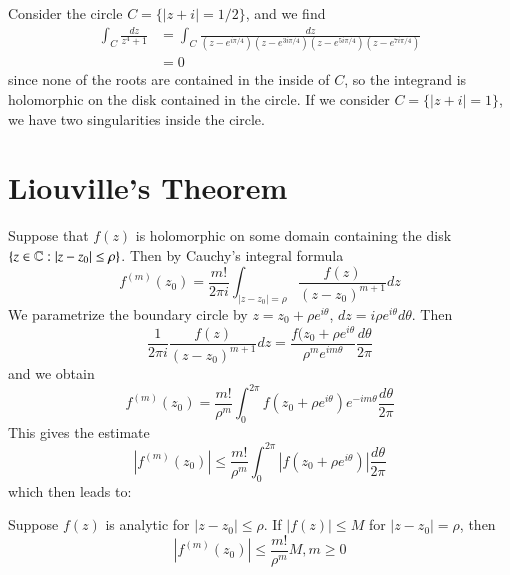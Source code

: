 \begin{example}
    Consider the circle $C= \{|z+i| = 1/2\}$, and we find \begin{align*}
        \int_C\frac{dz}{z^4+1} &= \int_C\frac{dz}{(z-e^{i\pi/4})(z-e^{3i\pi/4})(z-e^{5i\pi/4})(z-e^{7i\pi/4})} \\
        &= 0
    \end{align*}
    since none of the roots are contained in the inside of $C$, so the integrand is holomorphic on the disk contained in the circle. If we consider $C= \{|z+i| = 1\}$, we have two singularities inside the circle. 
\end{example}



\section{Liouville's Theorem}


Suppose that $f(z)$ is holomorphic on some domain containing the disk $\{z \in \mathbb C:|z-z_0| \leq \rho\}$. Then by Cauchy's integral formula \begin{equation*}
    f^{(m)}(z_0) = \frac{m!}{2\pi i}\int_{|z-z_0|=\rho}\frac{f(z)}{(z-z_0)^{m+1}}dz
\end{equation*}
We parametrize the boundary circle by $z = z_0 + \rho e^{i\theta}$, $dz = i\rho e^{i\theta}d\theta$. Then \begin{equation*}
    \frac{1}{2\pi i}\frac{f(z)}{(z-z_0)^{m+1}}dz = \frac{f(z_0+\rho e^{i\theta}}{\rho^me^{im\theta}}\frac{d\theta}{2\pi}
\end{equation*}
and we obtain \begin{equation*}
    f^{(m)}(z_0) = \frac{m!}{\rho^m}\int_0^{2\pi}f(z_0+\rho e^{i\theta})e^{-im\theta}\frac{d\theta}{2\pi}
\end{equation*}
This gives the estimate \begin{equation*}
    \left|f^{(m)}(z_0)\right| \leq \frac{m!}{\rho^m}\int_{0}^{2\pi}|f(z_0+\rho e^{i\theta})|\frac{d\theta}{2\pi}
\end{equation*}
which then leads to: 

\begin{theorem}
    Suppose $f(z)$ is analytic for $|z-z_0| \leq \rho$. If $|f(z)| \leq M$ for $|z - z_0| = \rho$, then \begin{equation*}
        \left|f^{(m)}(z_0)\right| \leq \frac{m!}{\rho^m}M, m \geq 0 
    \end{equation*}
\end{theorem}

